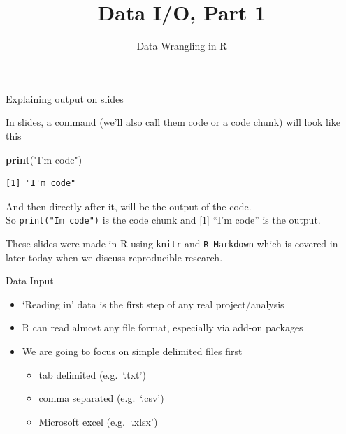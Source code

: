 \documentclass[
  ignorenonframetext,
]{beamer}
\title{Data I/O, Part 1}
\author{Data Wrangling in R}
\date{}
\newenvironment{Shaded}{\begin{snugshade}}{\end{snugshade}}
\newcommand{\KeywordTok}[1]{\textcolor[rgb]{0.13,0.29,0.53}{\textbf{#1}}}
\newcommand{\NormalTok}[1]{#1}
\newcommand{\StringTok}[1]{\textcolor[rgb]{0.31,0.60,0.02}{#1}}
\providecommand{\tightlist}{%
  \setlength{\itemsep}{0pt}\setlength{\parskip}{0pt}}
\begin{document}
\frame{\titlepage}

\begin{frame}[fragile]{Explaining output on slides}
\protect\hypertarget{explaining-output-on-slides}{}

In slides, a command (we'll also call them code or a code chunk) will
look like this

\begin{Shaded}
\begin{Highlighting}[]
\KeywordTok{print}\NormalTok{(}\StringTok{"I'm code"}\NormalTok{)}
\end{Highlighting}
\end{Shaded}

\begin{verbatim}
[1] "I'm code"
\end{verbatim}

And then directly after it, will be the output of the code.\\
So \texttt{print("I\textquotesingle{}m\ code")} is the code chunk and
{[}1{]} ``I'm code'' is the output.

These slides were made in R using \texttt{knitr} and
\texttt{R\ Markdown} which is covered in later today when we discuss
reproducible research.

\end{frame}

\begin{frame}{Data Input}
\protect\hypertarget{data-input}{}

\begin{itemize}
\tightlist
\item
  `Reading in' data is the first step of any real project/analysis
\item
  R can read almost any file format, especially via add-on packages
\item
  We are going to focus on simple delimited files first

  \begin{itemize}
  \tightlist
  \item
    tab delimited (e.g.~`.txt')
  \item
    comma separated (e.g.~`.csv')
  \item
    Microsoft excel (e.g.~`.xlsx')
  \end{itemize}
\end{itemize}

\end{frame}
\end{document}
